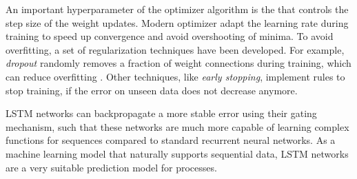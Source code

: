 An important hyperparameter of the optimizer algorithm is the  that controls the step size of the weight updates.
Modern optimizer adapt the learning rate during training to speed up convergence and avoid overshooting of minima.
To avoid overfitting, a set of regularization techniques have been developed.
For example, \textit{dropout} randomly removes a fraction of weight connections during training, which can reduce overfitting \cite{DBLP:journals/corr/abs-1207-0580}.
Other techniques, like \textit{early stopping}, implement rules to stop training, if the error on unseen data does not decrease anymore.

LSTM networks can backpropagate a more stable error using their gating mechanism, such that these networks are much more capable of learning complex functions for sequences compared to standard recurrent neural networks.
As a machine learning model that naturally supports sequential data, LSTM networks are a very suitable prediction model for processes.


